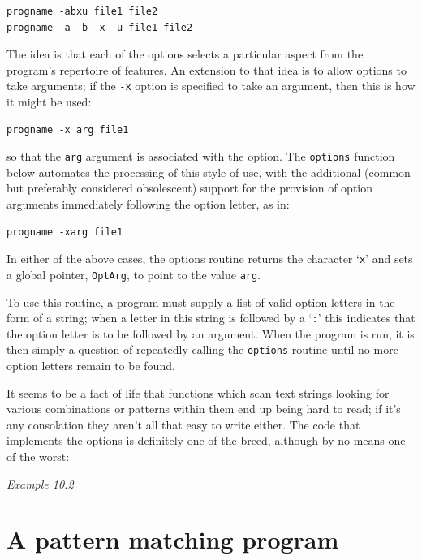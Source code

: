   \begin{Verbatim}
progname -abxu file1 file2
progname -a -b -x -u file1 file2
\end{Verbatim}

  The idea is that each of the options selects a particular aspect from the
   program's repertoire of features. An extension to that idea is to allow
   options to take arguments; if the \texttt{-x} option is specified to
   take an argument, then this is how it might be used:


  \begin{Verbatim}
progname -x arg file1
\end{Verbatim}

  so that the \texttt{arg} argument is associated with the option. The
   \texttt{options} function below automates the processing of this style
   of use, with the additional (common but preferably considered obsolescent)
   support for the provision of option arguments immediately following the
   option letter, as in:


  \begin{Verbatim}
progname -xarg file1
\end{Verbatim}

  In either of the above cases, the options routine returns the character
   `\texttt{x}' and sets a global pointer, \texttt{OptArg}, to
   point to the value \texttt{arg}.


  To use this routine, a program must supply a list of valid option letters
   in the form of a string; when a letter in this string is followed by
   a `\texttt{:}' this indicates that the option letter is to be
   followed by an argument. When the program is run, it is then simply
   a question of repeatedly calling the \texttt{options} routine until no
   more option letters remain to be found.


  It seems to be a fact of life that functions which scan text strings
   looking for various combinations or patterns within them end up being hard
   to read; if it's any consolation they aren't all that easy to write either.
   The code that implements the options is definitely one of the breed,
   although by no means one of the worst:


  \begin{center}\textit{Example 10.2}\end{center}


 
        \section{A pattern matching program}
        


